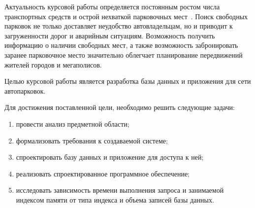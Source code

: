 
Актуальность курсовой работы определяется постоянным ростом числа транспортных средств и острой нехваткой парковочных мест~\cite{actual_parking}.
Поиск свободных парковок не только доставляет неудобство автовладельцам, но и приводит к загруженности дорог и аварийным ситуациям.
Возможность получить информацию о наличии свободных мест, а также возможность забронировать заранее парковочное место значительно облегчает планирование передвижений жителей городов и мегаполисов.

Целью курсовой работы является разработка базы данных и приложения для сети автопарковок.

Для достижения поставленной цели, необходимо решить следующие задачи:
\begin{enumerate}
	\item провести анализ предметной области;
	\item формализовать требования к создаваемой системе;
	\item спроектировать базу данных и приложение для доступа к ней;
	\item реализовать спроектированное программное обеспечение;
	\item исследовать зависимость времени выполнения запроса и занимаемой индексом памяти от типа индекса и объема записей базы данных.
\end{enumerate}

